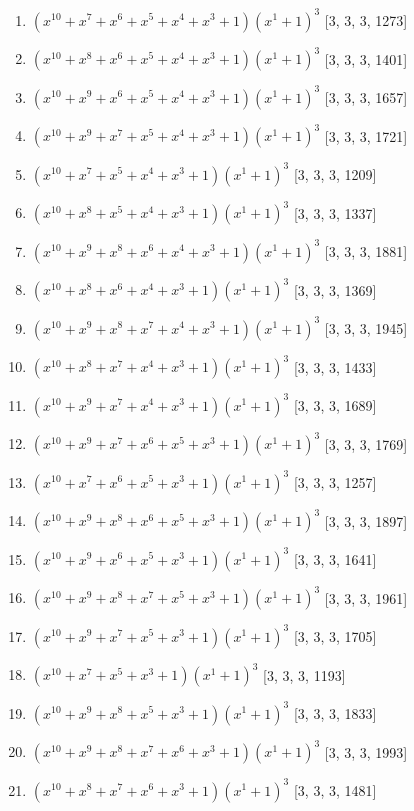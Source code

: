 \documentclass[10pt,twocolumn]{article}
\begin{document}
\begin{enumerate}
\item $(x^{10} + x^{7} + x^{6} + x^{5} + x^{4} + x^{3} + 1)(x^{1} + 1)^{3}$  [3, 3, 3, 1273]
\item $(x^{10} + x^{8} + x^{6} + x^{5} + x^{4} + x^{3} + 1)(x^{1} + 1)^{3}$  [3, 3, 3, 1401]
\item $(x^{10} + x^{9} + x^{6} + x^{5} + x^{4} + x^{3} + 1)(x^{1} + 1)^{3}$  [3, 3, 3, 1657]
\item $(x^{10} + x^{9} + x^{7} + x^{5} + x^{4} + x^{3} + 1)(x^{1} + 1)^{3}$  [3, 3, 3, 1721]
\item $(x^{10} + x^{7} + x^{5} + x^{4} + x^{3} + 1)(x^{1} + 1)^{3}$  [3, 3, 3, 1209]
\item $(x^{10} + x^{8} + x^{5} + x^{4} + x^{3} + 1)(x^{1} + 1)^{3}$  [3, 3, 3, 1337]
\item $(x^{10} + x^{9} + x^{8} + x^{6} + x^{4} + x^{3} + 1)(x^{1} + 1)^{3}$  [3, 3, 3, 1881]
\item $(x^{10} + x^{8} + x^{6} + x^{4} + x^{3} + 1)(x^{1} + 1)^{3}$  [3, 3, 3, 1369]
\item $(x^{10} + x^{9} + x^{8} + x^{7} + x^{4} + x^{3} + 1)(x^{1} + 1)^{3}$  [3, 3, 3, 1945]
\item $(x^{10} + x^{8} + x^{7} + x^{4} + x^{3} + 1)(x^{1} + 1)^{3}$  [3, 3, 3, 1433]
\item $(x^{10} + x^{9} + x^{7} + x^{4} + x^{3} + 1)(x^{1} + 1)^{3}$  [3, 3, 3, 1689]
\item $(x^{10} + x^{9} + x^{7} + x^{6} + x^{5} + x^{3} + 1)(x^{1} + 1)^{3}$  [3, 3, 3, 1769]
\item $(x^{10} + x^{7} + x^{6} + x^{5} + x^{3} + 1)(x^{1} + 1)^{3}$  [3, 3, 3, 1257]
\item $(x^{10} + x^{9} + x^{8} + x^{6} + x^{5} + x^{3} + 1)(x^{1} + 1)^{3}$  [3, 3, 3, 1897]
\item $(x^{10} + x^{9} + x^{6} + x^{5} + x^{3} + 1)(x^{1} + 1)^{3}$  [3, 3, 3, 1641]
\item $(x^{10} + x^{9} + x^{8} + x^{7} + x^{5} + x^{3} + 1)(x^{1} + 1)^{3}$  [3, 3, 3, 1961]
\item $(x^{10} + x^{9} + x^{7} + x^{5} + x^{3} + 1)(x^{1} + 1)^{3}$  [3, 3, 3, 1705]
\item $(x^{10} + x^{7} + x^{5} + x^{3} + 1)(x^{1} + 1)^{3}$  [3, 3, 3, 1193]
\item $(x^{10} + x^{9} + x^{8} + x^{5} + x^{3} + 1)(x^{1} + 1)^{3}$  [3, 3, 3, 1833]
\item $(x^{10} + x^{9} + x^{8} + x^{7} + x^{6} + x^{3} + 1)(x^{1} + 1)^{3}$  [3, 3, 3, 1993]
\item $(x^{10} + x^{8} + x^{7} + x^{6} + x^{3} + 1)(x^{1} + 1)^{3}$  [3, 3, 3, 1481]

\end{enumerate}
\end{document}
